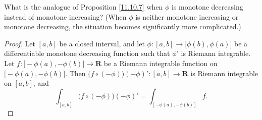 \begin{exercise}\label{ex 11.10.4}
    What is the analogue of Proposition \ref{11.10.7} when \(\phi\) is monotone decreasing instead of monotone increasing?
    (When \(\phi\) is neither monotone increasing or monotone decreasing, the situation becomes significantly more complicated.)
\end{exercise}

\begin{proof}
    Let \([a, b]\) be a closed interval, and let \(\phi : [a, b] \to \big[\phi(b), \phi(a)\big]\) be a differentiable monotone decreasing function such that \(\phi'\) is Riemann integrable.
    Let \(f : \big[-\phi(a), -\phi(b)\big] \to \mathbf{R}\) be a Riemann integrable function on \(\big[-\phi(a), -\phi(b)\big]\).
    Then \(\big(f \circ (-\phi)\big) (-\phi)' : [a, b] \to \mathbf{R}\) is Riemann integrable on \([a, b]\), and
    \[
        \int_{[a, b]} \big(f \circ (-\phi)\big) (-\phi)' = \int_{[-\phi(a), -\phi(b)]} f.
    \]
\end{proof}